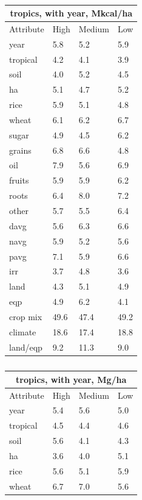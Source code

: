 \documentclass[11pt]{article}
\begin{document}
\begin{table}[h!]
\parbox{.45\linewidth} {
\centering
\begin{tabular}{llll}
\toprule
\multicolumn{4}{c}{\textbf{tropics, with year, Mkcal/ha}} \\
\midrule
Attribute & High & Medium & Low \\
\midrule
year & 5.8 & 5.2 & 5.9 \\
tropical & 4.2 & 4.1 & 3.9 \\
soil & 4.0 & 5.2 & 4.5 \\
ha & 5.1 & 4.7 & 5.2 \\
rice & 5.9 & 5.1 & 4.8 \\
wheat & 6.1 & 6.2 & 6.7 \\
sugar & 4.9 & 4.5 & 6.2 \\
grains & 6.8 & 6.6 & 4.8 \\
oil & 7.9 & 5.6 & 6.9 \\
fruits & 5.9 & 5.9 & 6.2 \\
roots & 6.4 & 8.0 & 7.2 \\
other & 5.7 & 5.5 & 6.4 \\
davg & 5.6 & 6.3 & 6.6 \\
navg & 5.9 & 5.2 & 5.6 \\
pavg & 7.1 & 5.9 & 6.6 \\
irr & 3.7 & 4.8 & 3.6 \\
land & 4.3 & 5.1 & 4.9 \\
eqp & 4.9 & 6.2 & 4.1 \\
\midrule
crop mix & 49.6 & 47.4 & 49.2 \\
climate & 18.6 & 17.4 & 18.8 \\
land/eqp & 9.2 & 11.3 & 9.0 \\
\bottomrule
\end{tabular}
\caption{ }
\label{k.wy.trop_percentages}
}
\parbox{.45\linewidth} {
\centering
\begin{tabular}{llll}
\toprule
\multicolumn{4}{c}{\textbf{tropics, with year, Mg/ha}} \\
\midrule
Attribute & High & Medium & Low \\
\midrule
year & 5.4 & 5.6 & 5.0 \\
tropical & 4.5 & 4.4 & 4.6 \\
soil & 5.6 & 4.1 & 4.3 \\
ha & 3.6 & 4.0 & 5.1 \\
rice & 5.6 & 5.1 & 5.9 \\
wheat & 6.7 & 7.0 & 5.6 \\

\end{tabular}}
\end{table}
\end{document}
